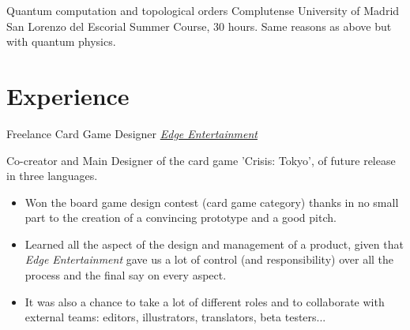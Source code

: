 \documentclass[11pt,a4paper,roman]{moderncv}
\begin{document}

	{Quantum computation and topological orders}
	{Complutense University of Madrid}
	{San Lorenzo del Escorial}
	{}
	{Summer Course, 30 hours. Same reasons as above but with quantum physics.}







\section{Experience}

	{Freelance Card Game Designer}
	{ \textit{\href{http://edgeent.com}{Edge Entertainment}}}
	{}
	{}
	{Co-creator and Main Designer of the card game 'Crisis: Tokyo', of future release in 
	three languages.
\begin{itemize}
	\item Won the board game design contest (card game category) thanks in no small 
	part to the creation of a convincing prototype and a good pitch.
	\item Learned all the aspect of the design and management of a product, given 
	that \textit{Edge Entertainment} gave us a lot of control (and responsibility) 
	over all the process and the final say on every aspect.
	\item It was also a chance to take a lot of different roles and to collaborate 
	with external teams: editors, illustrators, translators, beta testers...
\end{itemize}}
\end{document}
